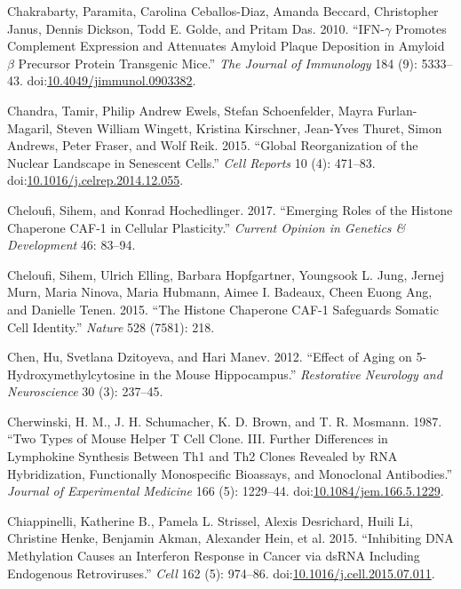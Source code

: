 \documentclass[onehalf,12pt]{beavtex}
\begin{document}
  \hypertarget{ref-ChakrabartyIFNgPromotesComplement2010}{}
  Chakrabarty, Paramita, Carolina Ceballos-Diaz, Amanda Beccard,
  Christopher Janus, Dennis Dickson, Todd E. Golde, and Pritam Das. 2010.
  ``IFN-\(\gamma\) Promotes Complement Expression and Attenuates Amyloid
  Plaque Deposition in Amyloid \(\beta\) Precursor Protein Transgenic
  Mice.'' \emph{The Journal of Immunology} 184 (9): 5333--43.
  doi:\href{https://doi.org/10.4049/jimmunol.0903382}{10.4049/jimmunol.0903382}.
  
  \hypertarget{ref-ChandraGlobalReorganizationNuclear2015}{}
  Chandra, Tamir, Philip Andrew Ewels, Stefan Schoenfelder, Mayra
  Furlan-Magaril, Steven William Wingett, Kristina Kirschner, Jean-Yves
  Thuret, Simon Andrews, Peter Fraser, and Wolf Reik. 2015. ``Global
  Reorganization of the Nuclear Landscape in Senescent Cells.'' \emph{Cell
  Reports} 10 (4): 471--83.
  doi:\href{https://doi.org/10.1016/j.celrep.2014.12.055}{10.1016/j.celrep.2014.12.055}.
  
  \hypertarget{ref-CheloufiEmergingroleshistone2017}{}
  Cheloufi, Sihem, and Konrad Hochedlinger. 2017. ``Emerging Roles of the
  Histone Chaperone CAF-1 in Cellular Plasticity.'' \emph{Current Opinion
  in Genetics \& Development} 46: 83--94.
  
  \hypertarget{ref-CheloufihistonechaperoneCAF12015}{}
  Cheloufi, Sihem, Ulrich Elling, Barbara Hopfgartner, Youngsook L. Jung,
  Jernej Murn, Maria Ninova, Maria Hubmann, Aimee I. Badeaux, Cheen Euong
  Ang, and Danielle Tenen. 2015. ``The Histone Chaperone CAF-1 Safeguards
  Somatic Cell Identity.'' \emph{Nature} 528 (7581): 218.
  
  \hypertarget{ref-ChenEffectaging5hydroxymethylcytosine2012}{}
  Chen, Hu, Svetlana Dzitoyeva, and Hari Manev. 2012. ``Effect of Aging on
  5-Hydroxymethylcytosine in the Mouse Hippocampus.'' \emph{Restorative
  Neurology and Neuroscience} 30 (3): 237--45.
  
  \hypertarget{ref-CherwinskiTwotypesmouse1987}{}
  Cherwinski, H. M., J. H. Schumacher, K. D. Brown, and T. R. Mosmann.
  1987. ``Two Types of Mouse Helper T Cell Clone. III. Further Differences
  in Lymphokine Synthesis Between Th1 and Th2 Clones Revealed by RNA
  Hybridization, Functionally Monospecific Bioassays, and Monoclonal
  Antibodies.'' \emph{Journal of Experimental Medicine} 166 (5): 1229--44.
  doi:\href{https://doi.org/10.1084/jem.166.5.1229}{10.1084/jem.166.5.1229}.
  
  \hypertarget{ref-ChiappinelliInhibitingDNAMethylation2015}{}
  Chiappinelli, Katherine B., Pamela L. Strissel, Alexis Desrichard, Huili
  Li, Christine Henke, Benjamin Akman, Alexander Hein, et al. 2015.
  ``Inhibiting DNA Methylation Causes an Interferon Response in Cancer via
  dsRNA Including Endogenous Retroviruses.'' \emph{Cell} 162 (5): 974--86.
  doi:\href{https://doi.org/10.1016/j.cell.2015.07.011}{10.1016/j.cell.2015.07.011}.
  
\end{document}
